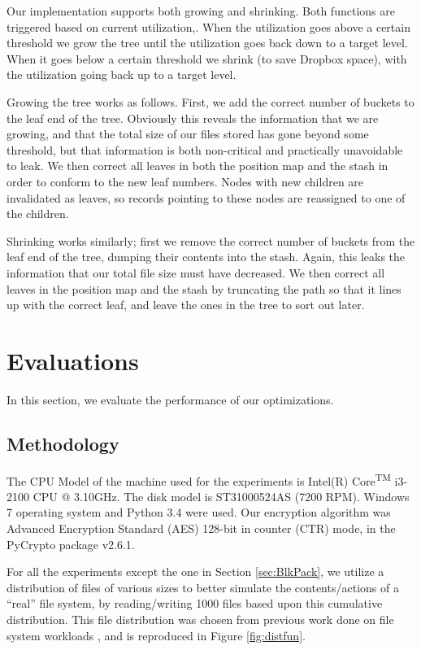 \documentclass[conference]{IEEEtran}
\begin{document}
Our implementation supports both growing and shrinking. Both functions are triggered based on current utilization,. When the utilization goes above a certain threshold we grow the tree until the utilization goes back down to a target level. When it goes below a certain threshold we shrink (to save Dropbox space), with the utilization going back up to a target level.

Growing the tree works as follows. First, we add the correct number of buckets to the leaf end of the tree. Obviously this reveals the information that we are growing, and that the total size of our files stored has gone beyond some threshold, but that information is both non-critical and practically unavoidable to leak. We then correct all leaves in both the position map and the stash in order to conform to the new leaf numbers. Nodes with new children are invalidated as leaves, so records pointing to these nodes are reassigned to one of the children.

Shrinking works similarly; first we remove the correct number of buckets from the leaf end of the tree, dumping their contents into the stash. Again, this leaks the information that our total file size must have decreased. We then correct all leaves in the position map and the stash by truncating the path so that it lines up with the correct leaf, and leave the ones in the tree to sort out later.

\section{Evaluations}

\label{sec:Eval}
In this section, we evaluate the performance of our optimizations. 
\subsection{Methodology}

The CPU Model of the machine used for the experiments is Intel(R) Core\textsuperscript{TM} i3-2100 CPU @ 3.10GHz. The disk model is ST31000524AS (7200 RPM). Windows 7 operating system and Python 3.4 were used. Our encryption algorithm was Advanced Encryption Standard (AES) 128-bit in counter (CTR) mode, in the PyCrypto package v2.6.1.

For all the experiments except the one in Section \ref{sec:BlkPack}, we utilize a distribution of files of various sizes to better simulate the contents/actions of a “real” file system, by reading/writing 1000 files based upon this cumulative distribution. This file distribution was chosen from previous work done on file system workloads \cite{roselli2000comparison}, and is reproduced in Figure \ref{fig:distfun}.
\end{document}
